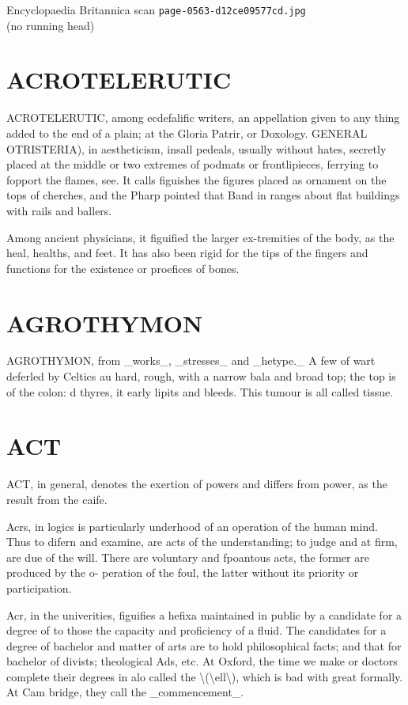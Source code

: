 \documentclass{article}
\begin{document}
\begin{center}
{\Large Encyclopaedia Britannica scan \texttt{page-0563-d12ce09577cd.jpg}}\\[0.5em]
(no running head)
\end{center}
\section*{ACROTELERUTIC}
ACROTELERUTIC, among ecdefalific writers, an appellation given to any thing added to the end of a plain; at the Gloria Patrir, or Doxology. GENERAL OTRISTERIA), in aestheticism, insall pedeals, usually without hates, secretly placed at the middle or two extremes of podmats or frontlipieces, ferrying to fopport the flames, see. It calls figuishes the figures placed as ornament on the tops of cherches, and the Pharp pointed that Band in ranges about flat buildings with rails and ballers.

Among ancient physicians, it figuified the larger ex-tremities of the body, as the heal, healths, and feet. It has also been rigid for the tips of the fingers and functions for the existence or proefices of bones.

\section*{AGROTHYMON}
AGROTHYMON, from \_works\_, \_stresses\_ and \_hetype.\_ A few of wart deferled by Celtics au hard, rough, with a narrow bala and broad top; the top is of the colon: d thyres, it early lipits and bleeds. This tumour is all called tissue.

\section*{ACT}
ACT, in general, denotes the exertion of powers and differs from power, as the result from the caife.

Acrs, in logics is particularly underhood of an operation of the human mind. Thus to difern and examine, are acts of the understanding; to judge and at firm, are due of the will. There are voluntary and fpoantous acts, the former are produced by the o- peration of the foul, the latter without its priority or participation.

Acr, in the univerities, figuifies a hefixa maintained in public by a candidate for a degree of to those the capacity and proficiency of a fluid. The candidates for a degree of bachelor and matter of arts are to hold philosophical facts; and that for bachelor of divists; theological Ads, etc. At Oxford, the time we make or doctors complete their degrees in alo called the \textbackslash{}(\textbackslash{}ell\textbackslash{}), which is bad with great formally. At Cam bridge, they call the \_commencement\_.
\end{document}
